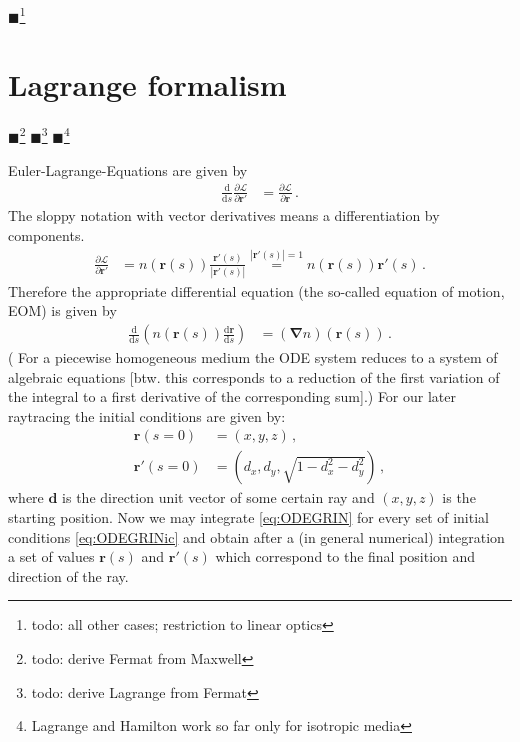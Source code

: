 \documentclass[12pt,a4paper,twoside,openright,BCOR10mm,headsepline,titlepage,abstracton,chapterprefix,final]{scrreprt}
\newcommand\Vector[1]{{\mathbf{#1}}}
\newcommand{\remark}[1]{{\color{red}$\blacksquare$}\footnote{{\color{red}#1}}}
\newcommand\totald{\textrm{d}}
\begin{document}
\remark{todo: all other cases; restriction to linear optics}

\section{Lagrange formalism}
\remark{todo: derive Fermat from Maxwell}
\remark{todo: derive Lagrange from Fermat}
\remark{Lagrange and Hamilton work so far only for isotropic media}

Euler-Lagrange-Equations are given by
\begin{align}
 \frac{\totald}{\totald s} \frac{\partial \mathcal{L}}{\partial \Vector{r}'} &= \frac{\partial \mathcal{L}}{\partial \Vector{r}}\,.
\end{align}
The sloppy notation with vector derivatives means a differentiation by components.
\begin{align}
 \frac{\partial \mathcal{L}}{\partial \Vector{r}'} &= n(\Vector{r}(s)) \frac{\Vector{r}'(s)}{|\Vector{r}'(s)|} \stackrel{|\Vector{r}'(s)|=1}{=} n(\Vector{r}(s))\Vector{r}'(s)\,.
\end{align}
Therefore the appropriate differential equation (the so-called equation of motion, EOM) is given by
\begin{align}
 \frac{\totald}{\totald s} \left(n(\Vector{r}(s)) \frac{\totald\Vector{r}}{\totald s}\right) &= (\Vector{\nabla} n)(\Vector{r}(s)) \label{eq:ODEGRIN}\,.
\end{align}
( For a piecewise homogeneous medium the ODE system reduces to a system of algebraic equations 
[btw. this corresponds to a reduction of the
first variation of the integral to a first derivative of the corresponding sum].) 
For our later raytracing the initial conditions are given by:
\begin{subequations}
\label{eq:ODEGRINic}
\begin{align}
 \Vector{r}(s=0) &= (x,y,z)\,,\\
 \Vector{r}'(s=0) &= (d_x, d_y, \sqrt{1-d_x^2-d_y^2})\,,
\end{align}
\end{subequations}
where $\Vector{d}$ is the direction unit vector of some certain ray and $(x,y,z)$ is the starting position.
Now we may integrate \eqref{eq:ODEGRIN} for every set of initial conditions \eqref{eq:ODEGRINic}
and obtain after a (in general numerical) integration a set of values $\Vector{r}(s)$ and $\Vector{r}'(s)$
which correspond to the final position and direction of the ray.
\end{document}
